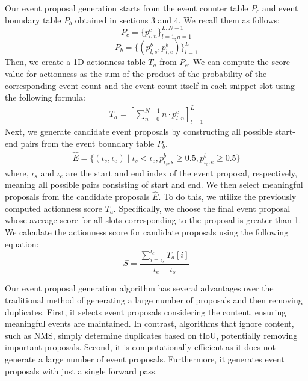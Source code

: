 Our event proposal generation starts from the event counter table $P_c$ and event boundary table $P_b$ obtained in sections 3 and 4. We recall them as follows:
$$
  P_c = \{p_{l,n}^c\}_{l=1,n=1}^{L, N-1}
$$
$$
  P_b = \{(p_{l,s}^b, p_{l,e}^b)\}_{l=1}^{L}
$$
Then, we create a 1D actionness table $T_a$ from $P_c$.
We can compute the score value for actionness as the sum of the product of the probability of the corresponding event count and the event count itself in each snippet slot using the following formula:
\begin{align}
  T_{a} = \left[ \sum_{n=0}^{N-1} n \cdot p_{l,n}^c \right]_{l=1}^L
\end{align}
Next, we generate candidate event proposals by constructing all possible start-end pairs from the event boundary table $P_b$.
\begin{align}
  \hat{E} = \{(\iota_s, \iota_e) \mid \iota_s < \iota_e, p_{\iota_s,s}^b \geq 0.5, p_{\iota_e,e}^b \geq 0.5\}
\end{align}
where, $\iota_s$ and $\iota_e$ are the start and end index of the event proposal, respectively, meaning all possible pairs consisting of start and end.
We then select meaningful proposals from the candidate proposals $\hat{E}$.
To do this, we utilize the previously computed actionness score $T_a$.
Specifically, we choose the final event proposal whose average score for all slots corresponding to the proposal is greater than 1.
We calculate the actionness score for candidate proposals using the following equation:
$$
  S = \frac{ \sum_{i=\iota_s}^{\iota_e} T_a\left[ i \right] }{\iota_e - \iota_s}
$$

Our event proposal generation algorithm has several advantages over the traditional method of generating a large number of proposals and then removing duplicates.
First, it selects event proposals considering the content, ensuring meaningful events are maintained.
In contrast, algorithms that ignore content, such as NMS, simply determine duplicates based on tIoU, potentially removing important proposals.
Second, it is computationally efficient as it does not generate a large number of event proposals.
Furthermore, it generates event proposals with just a single forward pass.

